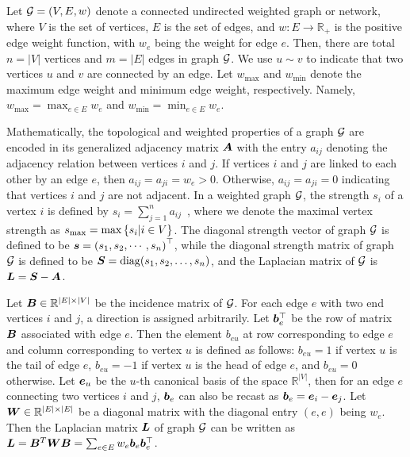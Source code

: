 \documentclass[10pt,journal,compsoc,twocolumn,twoside]{IEEEtran}
\begin{document}
Let \(\mathcal{G}=(V,E,w)\) denote a connected undirected weighted graph or network,  where \(V\) is the set of vertices,  \(E\) is the set of edges, and  \(w: E\to \mathbb{R}_{+}\) is the positive edge weight function, with \(w_e\) being the weight for edge \(e\). Then, there are total \(n=|V|\) vertices and \(m=|E|\) edges in graph \(\mathcal{G}\). We use \(u \sim v\) to indicate that two vertices \(u\) and \(v\) are connected by an edge. Let \(w_{\max}\) and \(w_{\min}\) denote the maximum edge weight and minimum edge weight, respectively. Namely, \(w_{\max}=\max_{e\in E} w_e \) and \(w_{\min}=\min_{e\in E} w_e\).

Mathematically, the topological and weighted properties of a graph \(\mathcal{G}\) are encoded in its generalized adjacency matrix \(\boldsymbol{A}\) with the entry \(a_{ij}\) denoting the adjacency relation between vertices \(i\) and \(j\). If vertices \(i\) and \(j\) are linked to each other by an edge \(e\), then \(a_{ij}= a_{ji}=w_{e}> 0\). Otherwise, \(a_{ij}=a_{ji}=0\) indicating that vertices \(i\) and \(j\) are not adjacent. In a weighted graph \(\mathcal{G}\), the strength  \(s_i\) of a vertex \(i\) is defined by \(s_i=\sum_{j=1}^n a_{ij}\)~\cite{BaBaPaVe04}, where we denote the maximal vertex strength as \(s_{\max}=\max\left\{s_i|i\in V \right\}\).
The diagonal strength vector of graph \(\mathcal{G}\) is defined to be \(\boldsymbol{s}=\left( s_1,s_2,\cdots,s_n \right)^\top\), while the diagonal strength matrix of graph \(\mathcal{G}\) is defined to be \({\boldsymbol{S}} = {\rm diag}(s_1, s_2, \ldots, s_n)\), and the Laplacian matrix of \(\mathcal{G}\) is \({\boldsymbol{L}}={\boldsymbol{S}}-{\boldsymbol{A}}\).

Let \(\boldsymbol{B} \in \mathbb{R}^{|E| \times |V|}\) be the incidence matrix of \(\mathcal{G}\). For each edge \(e\) with two end vertices \(i\) and \(j\), a direction is assigned arbitrarily. Let \(\boldsymbol{b}_e^\top\) be the row of matrix \(\boldsymbol{B}\) associated with edge \(e\). Then the element \(b_{eu}\) at row corresponding to edge \(e\) and column corresponding to vertex \(u\) is defined as follows: \(b_{eu} = 1\) if vertex \(u\) is the tail of edge \(e\), \(b_{eu}=-1\) if vertex \(u\) is the head of  edge \(e\), and \(b_{eu}=0\) otherwise. Let \(\boldsymbol{e}_u\) be the \(u\)-th canonical basis of the space \(\mathbb{R}^{|V|}\), then for an edge \(e\) connecting two vertices \(i\) and \(j\), \(\boldsymbol{b}_e\) can also be recast as \(\boldsymbol{b}_e=\boldsymbol{e}_{i}-\boldsymbol{e}_{j}\).  Let  \(\boldsymbol{W} \in \mathbb{R}^{|E| \times |E|}\) be a diagonal matrix with the diagonal entry \((e,e)\) being \(w_e\). Then the Laplacian matrix \(\boldsymbol{L}\) of graph \(\mathcal{G}\) can be written as \(\boldsymbol{L}=\boldsymbol{B}^T\boldsymbol{W}\boldsymbol{B}=\sum_{e\in E}w_e\boldsymbol{b}_e\boldsymbol{b}_e^{\top}\).
\end{document}
